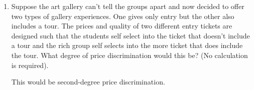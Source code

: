 \documentclass[12pt]{article}
\newcounter{question}[section]
\newenvironment{subquestions}{
  \begin{enumerate}[label=(\roman*)]}{\end{enumerate}}
\begin{document}
\begin{subquestions}
    \textcolor{solution-color}{
      For the other group, $MR_R\left( q_R
      \right)=40-2q_R$ and $MC_R\left( q_R \right)=10$. Setting these equal
      gives $q_R=15$. The price is then $p_S=40-15=25$.
    }

    \bigskip
    \textcolor{solution-color}{
      Total profits are then:
      \[
        \pi=p_Sq_S + p_Rq_R-10\times\left( q_S+q_R \right)-10=15\times 5 +
        25\times 15 - 10\times \left( 5+15 \right)-10=240
      \]
      Consumer surplus is the sum of consumer surplus from the two groups:
      \[
        CS=\frac{1}{2}\times\left( 20-15 \right)\times 5 +
        \frac{1}{2}\times \left( 40-25 \right)\times 15 = 12.5 + 112.5=125
      \]
      The consumer surplus is actually larger under price discrimination.
    }
  \item Suppose the art gallery can't tell the groups apart
    and now decided to offer two types of gallery experiences. One gives only
    entry but the other also includes a tour. The prices and quality of two
    different entry tickets are designed such that the students self select
    into the ticket that doesn't include a tour and the rich group self selects
    into the more ticket that does include the tour. What degree of price
    discrimination would this be? (No calculation is required).

    \textcolor{solution-color}{
      This would be second-degree price discrimination.
    }
\end{subquestions}
\end{document}
